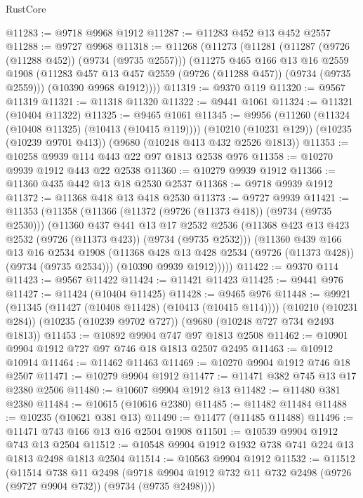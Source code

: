 \begin{lexlean}{RustCore}
\begin{coremodule}
@11283 := @9718 @9968 @1912
@11287 := @11283 @452 @13 @452 @2557
@11288 := @9727 @9968
@11318 := @11268
    (@11273
      (@11281
        (@11287 (@9726 (@11288 @452)) (@9734 (@9735 @2557)))
        (@11275
          @465
          @166
          @13
          @16
          @2559
          @1908
          (@11283 @457 @13 @457 @2559 (@9726 (@11288 @457)) (@9734 (@9735 @2559)))
          (@10390 @9968 @1912))))
@11319 := @9370 @119
@11320 := @9567 @11319
@11321 := @11318 @11320
@11322 := @9441 @1061
@11324 := @11321 (@10404 @11322)
@11325 := @9465 @1061
@11345 := @9956
    (@11260 (@11324 (@10408 @11325) (@10413 (@10415 @119))))
    (@10210 (@10231 @129))
    (@10235 (@10239 @9701 @413))
    (@9680 (@10248 @413 @432 @2526 @1813))
@11353 := @10258 @9939 @114 @443 @22 @97 @1813 @2538 @976
@11358 := @10270 @9939 @1912 @443 @22 @2538
@11360 := @10279 @9939 @1912
@11366 := @11360 @435 @442 @13 @18 @2530 @2537
@11368 := @9718 @9939 @1912
@11372 := @11368 @418 @13 @418 @2530
@11373 := @9727 @9939
@11421 := @11353
    (@11358
      (@11366
        (@11372 (@9726 (@11373 @418)) (@9734 (@9735 @2530)))
        (@11360
          @437
          @441
          @13
          @17
          @2532
          @2536
          (@11368 @423 @13 @423 @2532 (@9726 (@11373 @423)) (@9734 (@9735 @2532)))
          (@11360
            @439
            @166
            @13
            @16
            @2534
            @1908
            (@11368 @428 @13 @428 @2534 (@9726 (@11373 @428)) (@9734 (@9735 @2534)))
            (@10390 @9939 @1912)))))
@11422 := @9370 @114
@11423 := @9567 @11422
@11424 := @11421 @11423
@11425 := @9441 @976
@11427 := @11424 (@10404 @11425)
@11428 := @9465 @976
@11448 := @9921
    (@11345 (@11427 (@10408 @11428) (@10413 (@10415 @114))))
    (@10210 (@10231 @284))
    (@10235 (@10239 @9702 @727))
    (@9680 (@10248 @727 @734 @2493 @1813))
@11453 := @10892 @9904 @747 @97 @1813 @2508
@11462 := @10901 @9904 @1912 @727 @97 @746 @18 @1813 @2507 @2495
@11463 := @10912 @10914
@11464 := @11462 @11463
@11469 := @10270 @9904 @1912 @746 @18 @2507
@11471 := @10279 @9904 @1912
@11477 := @11471 @382 @745 @13 @17 @2380 @2506
@11480 := @10607 @9904 @1912 @13
@11482 := @11480 @381 @2380
@11484 := @10615 (@10616 @2380)
@11485 := @11482 @11484
@11488 := @10235 (@10621 @381 @13)
@11490 := @11477 (@11485 @11488)
@11496 := @11471 @743 @166 @13 @16 @2504 @1908
@11501 := @10539 @9904 @1912 @743 @13 @2504
@11512 := @10548 @9904 @1912 @1932 @738 @741 @224 @13 @1813 @2498 @1813 @2504
@11514 := @10563 @9904 @1912
@11532 := @11512
    (@11514
      @738
      @11
      @2498
      (@9718 @9904 @1912 @732 @11 @732 @2498 (@9726 (@9727 @9904 @732)) (@9734 (@9735 @2498))))

\end{coremodule}
\end{lexlean}
